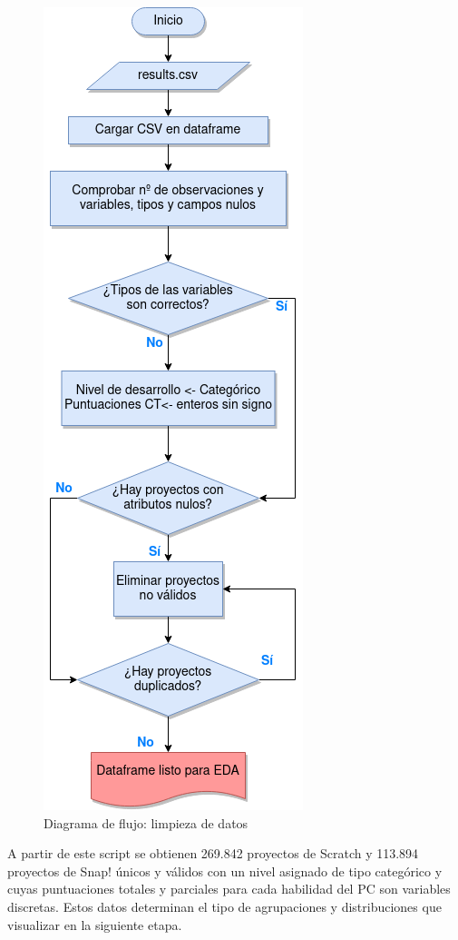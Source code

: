 \documentclass[a4paper, 12pt]{book}
\begin{document}
\begin{figure}[ht]
    \centering
    \includegraphics[height=.6\textheight]{img/script_clean2.png}
    \caption{Diagrama de flujo: limpieza de datos}\label{fig:script_clean}
\end{figure}

A partir de este script se obtienen 269.842 proyectos de Scratch y 113.894 proyectos de Snap! únicos y válidos con un nivel asignado de tipo categórico y cuyas puntuaciones totales y parciales para cada habilidad del PC son variables discretas. Estos datos determinan el tipo de agrupaciones y distribuciones que visualizar en la siguiente etapa.
\end{document}
